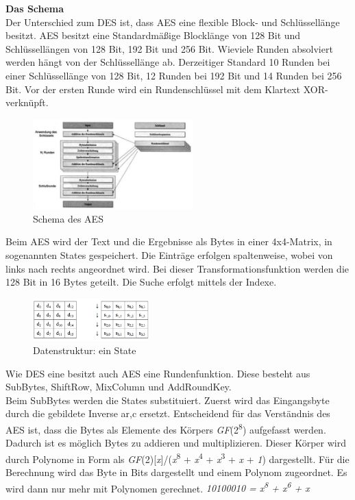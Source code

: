 \documentclass[11pt]{scrartcl}
\begin{document}
\noindent \textbf{Das Schema}\\
Der Unterschied zum DES ist, dass AES eine flexible Block- und Schlüssellänge besitzt. AES besitzt eine Standardmäßige Blocklänge von 128 Bit und Schlüssellängen von 128 Bit, 192 Bit und 256 Bit. Wieviele Runden absolviert werden hängt von der Schlüssellänge ab. Derzeitiger Standard 10 Runden bei einer Schlüssellänge von 128 Bit, 12 Runden bei 192 Bit und 14 Runden bei 256 Bit. \grqq{}Vor der ersten Runde wird ein Rundenschlüssel mit dem Klartext XOR-verknüpft.\grqq{}\cite{2} \cite{3}
\begin{figure}[H]
\includegraphics[width=0.55\textwidth]{Bilder/AES/AES_Schema}
	\caption{Schema des AES \cite{2}}
	\label{fig6}
\end{figure}
\noindent 
Beim AES wird der Text und die Ergebnisse als Bytes in einer 4x4-Matrix, in sogenannten States gespeichert. Die Einträge erfolgen spaltenweise, wobei von links nach rechts angeordnet wird. Bei dieser Transformationsfunktion werden die 128 Bit in 16 Bytes geteilt. Die Suche erfolgt mittels der Indexe. \cite{2}\cite{3}
\begin{figure}[H]
\includegraphics[width=0.40\textwidth]{Bilder/AES/AES_State}
	\caption{Datenstruktur: ein State \cite{3}}
	\label{fig7}
\end{figure}
\noindent
Wie DES eine besitzt auch AES eine Rundenfunktion. Diese besteht aus SubBytes, ShiftRow, MixColumn und AddRoundKey.\\
Beim SubBytes werden die States substituiert. Zuerst wird das Eingangsbyte durch die gebildete Inverse a{\tiny r,c} ersetzt.
\grqq{}Entscheidend für das Verständnis des AES ist, dass die Bytes als Elemente des Körpers \textit{GF}(2\textsuperscript{8}) aufgefasst werden.\grqq{}\cite{2} Dadurch ist es möglich Bytes zu addieren und multiplizieren. Dieser Körper wird durch Polynome in Form als \textit{GF}(2)[\textit{x}]/(\textit{x}\textsuperscript{8} + \textit{x}\textsuperscript{4} + \textit{x}\textsuperscript{3} + \textit{x} + \textit{1}) dargestellt. Für die Berechnung wird das Byte in Bits dargestellt und einem Polynom zugeordnet. Es wird dann nur mehr mit Polynomen gerechnet. \textit{{10100010} = x\textsuperscript{8} + x\textsuperscript{6} + x}\\
\end{document}
